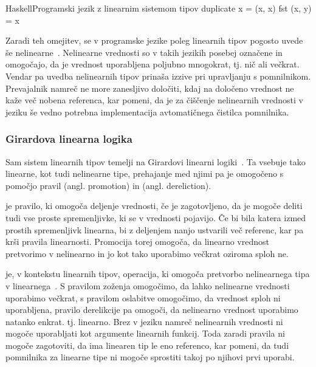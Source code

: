 \begin{code-box}{Haskell}{Programski jezik z linearnim sistemom tipov \xmark}
duplicate x = (x, x)
fst (x, y) = x
\end{code-box}

Zaradi teh omejitev, se v programske jezike poleg linearnih tipov pogosto uvede še nelinearne~\cite{pierce2004advanced, wadler1990linear, marshall2022linearity}. Nelinearne vrednosti so v takih jezikih posebej označene in omogočajo, da je vrednost uporabljena poljubno mnogokrat, tj. nič ali večkrat. Vendar pa uvedba nelinearnih tipov prinaša izzive pri upravljanju s pomnilnikom. Prevajalnik namreč ne more zanesljivo določiti, kdaj na določeno vrednost ne kaže več nobena referenca, kar pomeni, da je za čiščenje nelinearnih vrednosti v jeziku še vedno potrebna implementacija avtomatičnega čistilca pomnilnika.

\subsubsection{Girardova linearna logika}

Sam sistem linearnih tipov temelji na Girardovi linearni logiki~\cite{girard1987linear}. Ta vsebuje tako linearne, kot tudi nelinearne tipe, prehajanje med njimi pa je omogočeno s pomočjo pravil  (angl. promotion) in  (angl. dereliction).

 je pravilo, ki omogoča deljenje vrednosti, če je zagotovljeno, da je mogoče deliti tudi vse proste spremenljivke, ki se v vrednosti pojavijo. Če bi bila katera izmed prostih spremenljivk linearna, bi z deljenjem nanjo ustvarili več referenc, kar pa krši pravila linearnosti. Promocija torej omogoča, da linearno vrednost pretvorimo v nelinearno in jo kot tako uporabimo večkrat oziroma sploh ne.

 je, v kontekstu linearnih tipov, operacija, ki omogoča pretvorbo nelinearnega tipa v linearnega~\cite{wadler1991there}. S pravilom zoženja omogočimo, da lahko nelinearne vrednosti uporabimo večkrat, s pravilom oslabitve o\-mo\-go\-či\-mo, da vrednost sploh ni uporabljena, pravilo derelikcije pa omogoči, da nelinearno vrednost uporabimo natanko enkrat. tj. linearno. Brez  v jeziku namreč nelinearnih vrednosti ni mogoče uporabljati kot argumente linearnih funkcij. Toda zaradi pravila  ni mogoče zagotoviti, da ima linearen tip le eno referenco, kar pomeni, da tudi pomnilnika za linearne tipe ni mogoče sprostiti takoj po njihovi prvi uporabi.


